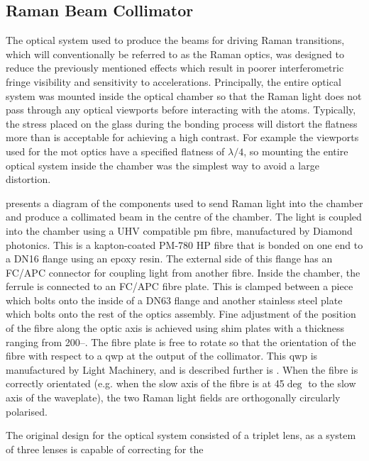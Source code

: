 \subsection{Raman Beam Collimator}\label{subsec:setup_ramancollimator}
The optical system used to produce the beams for driving Raman transitions,
which will conventionally be referred to as the Raman optics, was designed to
reduce the previously mentioned effects which result in poorer interferometric
fringe visibility and sensitivity to accelerations. Principally, the entire
optical system was mounted inside the optical chamber so that the Raman light
does not pass through any optical viewports before interacting with the atoms.
Typically, the stress placed on the glass during the bonding process will
distort the flatness more than is acceptable for achieving a high contrast. For
example the viewports used for the \ac{mot} optics have a specified flatness of
\(\lambda/4\), so mounting the entire optical system inside the chamber was the
simplest way to avoid a large distortion. \par\noindent
{} presents a diagram of the components used to
send Raman light into the chamber and produce a collimated beam in the centre of
the chamber. The light is coupled into the chamber using a UHV compatible
\ac{pm} fibre, manufactured by Diamond photonics. This is a kapton-coated PM-780
HP fibre that is bonded on one end to a DN16 flange using an epoxy resin. The
external side of this flange has an FC/APC connector for coupling light from
another fibre. Inside the chamber, the ferrule is connected to an FC/APC fibre
plate. This is clamped between a piece which bolts onto the inside of a DN63
flange and another stainless steel plate which bolts onto the rest of the optics
assembly. Fine adjustment of the position of the fibre along the optic axis is
achieved using shim plates with a thickness ranging from
200--. The fibre plate is free to rotate so that the
orientation of the fibre with respect to a \ac{qwp} at the output of the
collimator. This \ac{qwp} is manufactured by Light Machinery, and is described
further is . When the fibre is correctly
orientated (e.g. when the slow axis of the fibre is at 45\(\deg\) to the slow
axis of the waveplate), the two Raman light fields are orthogonally circularly
polarised. \par\noindent The original design for the optical system consisted of
a triplet lens, as a system of three lenses is capable of correcting for the
